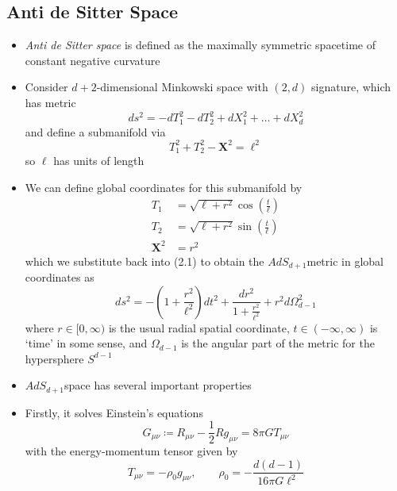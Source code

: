 \documentclass[12pt,a4paper]{article}
\numberwithin{equation}{section}
\begin{document}
	\subsection{Anti de Sitter Space}
	\newcommand{\ads}{\ensuremath{AdS_{d+1}}}
	\begin{itemize}
		\item \textit{Anti de Sitter space} is defined as the maximally symmetric spacetime of constant negative curvature
		\item Consider $d+2$-dimensional Minkowski space with $(2,d)$ signature, which has metric
		\begin{equation}
			ds^{2}=-dT_{1}^{2}-dT_{2}^{2}+dX_{1}^{2}+\ldots+dX_{d}^{2}
		\end{equation}
		and define a submanifold via
		\begin{equation}
			T_{1}^{2}+T_{2}^{2}-\mathbf{X}^{2}=\ell^{2}
		\end{equation}
		so $\ell$ has units of length
		\item We can define global coordinates for this submanifold by
		\begin{equation}
			\begin{aligned}
				T_{1}&=\sqrt{\ell+r^{2}}\cos\left(\frac{t}{\ell}\right)\\
				T_{2}&=\sqrt{\ell+r^{2}}\sin\left(\frac{t}{\ell}\right)\\
				\mathbf{X}^{2}&=r^{2}
			\end{aligned}
		\end{equation}
		which we substitute back into (2.1) to obtain the \ads metric in global coordinates as
		\begin{equation}
			ds^{2}=-\left(1+\frac{r^{2}}{\ell^{2}}\right)dt^{2}+\frac{dr^{2}}{1+\frac{r^{2}}{\ell^{2}}}+r^{2}d\Omega_{d-1}^{2}
		\end{equation}
		where $r\in[0,\infty)$ is the usual radial spatial coordinate, $t\in(-\infty,\infty)$ is `time' in some sense, and $\Omega_{d-1}$ is the angular part of the metric for the hypersphere $S^{d-1}$
		\item \ads space has several important properties
		\item Firstly, it solves Einstein's equations
		\begin{equation}
			G_{\mu\nu}\coloneqq R_{\mu\nu}-\frac{1}{2}R g_{\mu\nu}=8\pi G T_{\mu\nu}
		\end{equation}
		with the energy-momentum tensor given by
		\begin{equation}
			T_{\mu\nu}=-\rho_{0}g_{\mu\nu},\qquad \rho_{0}=-\frac{d(d-1)}{16\pi G\ell^{2}}

\end{equation}
\end{itemize}
\end{document}
